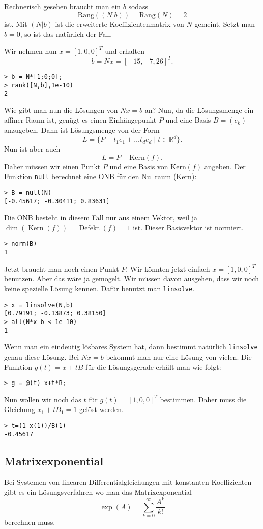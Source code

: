 \documentclass[a4paper,11pt,fleqn,twocolumn,twoside,dvipdfmx]{scrartcl}
\begin{document}
Rechnerisch gesehen braucht man ein $b$ sodass
\[\mathrm{Rang}((N|b))=\mathrm{Rang}(N)=2\]
ist. Mit $(N|b)$ ist die erweiterte Koeffizientenmatrix von $N$
gemeint. Setzt man $b=0$, so ist das natürlich der Fall.

Wir nehmen nun $x=[1,0,0]^T$ und erhalten
\[b=Nx = [-15,-7,26]^T.\]
\begin{verbatim}
> b = N*[1;0;0];
> rank([N,b],1e-10)
2
\end{verbatim}
Wie gibt man nun die Lösungen von $Nx=b$ an? Nun, da die
Lösungsmenge ein affiner Raum ist, genügt es einen Einhängepunkt
$P$ und eine Basis $B=(e_k)$ anzugeben. Dann ist Lösungsmenge von
der Form
\[L = \{P+t_1e_1+\ldots t_d e_d\;|\; t\in\mathbb R^d\}.\]
Nun ist aber auch
\[L = P+\mathrm{Kern}(f).\]
Daher müssen wir einen Punkt $P$ und eine Basis von
$\mathrm{Kern}(f)$ angeben. Der Funktion \texttt{null} berechnet eine
ONB für den Nullraum (Kern):
\begin{verbatim}
> B = null(N)
[-0.45617; -0.30411; 0.83631]
\end{verbatim}
Die ONB besteht in diesem Fall nur aus einem Vektor,
weil ja $\dim(\operatorname{Kern}(f))=\operatorname{Defekt}(f)=1$ ist.
Dieser Basisvektor ist normiert.
\begin{verbatim}
> norm(B)
1
\end{verbatim}
Jetzt braucht man noch einen Punkt $P$. Wir könnten jetzt einfach
$x=[1,0,0]^T$ benutzen. Aber das wäre ja gemogelt. Wir müssen
davon ausgehen, dass wir noch keine spezielle Lösung kennen.
Dafür benutzt man \texttt{linsolve}.
\begin{verbatim}
> x = linsolve(N,b)
[0.79191; -0.13873; 0.38150]
> all(N*x-b < 1e-10)
1
\end{verbatim}
Wenn man ein eindeutig lösbares System hat, dann bestimmt
natürlich \texttt{linsolve} genau diese Lösung. Bei $Nx=b$
bekommt man nur eine Lösung von vielen. Die Funktion $g(t)=x+tB$
für die Lösungsgerade erhält man wie folgt:
\begin{verbatim}
> g = @(t) x+t*B;
\end{verbatim}
Nun wollen wir noch das $t$ für $g(t)=[1,0,0]^T$ bestimmen.
Daher muss die Gleichung $x_1+tB_1=1$ gelöst werden.
\begin{verbatim}
> t=(1-x(1))/B(1)
-0.45617
\end{verbatim}

\subsection{Matrixexponential}
Bei Systemen von linearen Differentialgleichungen mit konstanten
Koeffizienten gibt es ein Lösungsverfahren wo man das
Matrixexponential
\[\exp(A)=\sum_{k=0}^\infty\frac{A^k}{k!}\]
berechnen muss.
\end{document}

